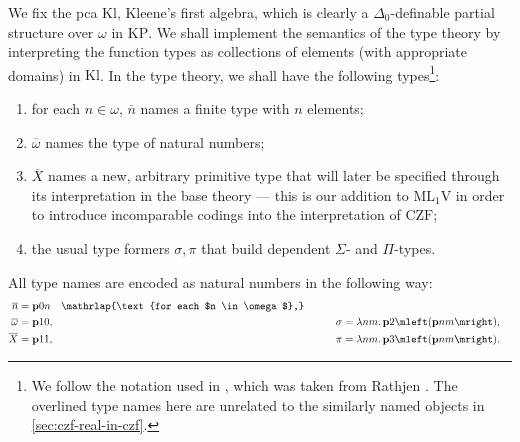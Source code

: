 \documentclass[12pt,openany]{book}
\theoremstyle{plain}
\theoremstyle{definition}
\newcommand\uplabel[1]{\textup{(#1)}}
\newcommand\oplam[1]{\mathop{\lambda #1.}}
\newcommand\KP{\mathrm{KP}}
\newcommand\CZF{\mathrm{CZF}}
\newcommand\MLV{\mathrm{ML}_1\mathrm{V}}
\newcommand\Kl{\mathrm{Kl}}
\newcommand\bp{\mathbf{p}}
\begin{document}
We fix the pca $\Kl$, Kleene's first algebra, which is clearly a $\Delta_0$-definable partial structure over $\omega$ in $\KP$. We shall implement the semantics of the type theory by interpreting the function types as collections of elements (with appropriate domains) in $\Kl$. In the type theory, we shall have the following types\footnote{We follow the notation used in \cite{wang-sw26-czf-v-l-pre}, which was taken from Rathjen \cite{rathjen14-czf-lpo}. The overlined type names here are unrelated to the similarly named objects in \autoref{sec:czf-real-in-czf}.}:
\begin{enumerate}[label=\uplabel{\arabic*}]
  \item for each $n \in \omega$, $\overline{n}$ names a finite type with $n$ elements;
  \item $\overline{\omega}$ names the type of natural numbers;
  \item $\overline{X}$ names a new, arbitrary primitive type that will later be specified through its interpretation in the base theory --- this is our addition to $\MLV$ in order to introduce incomparable codings into the interpretation of $\CZF$;
  \item the usual type formers $\sigma, \pi$ that build dependent $\Sigma$- and $\Pi$-types.
\end{enumerate}
All type names are encoded as natural numbers in the following way:
\begin{alignat*}{2}
  \overline{n}      & = \bp 0n \quad \mathrlap{\text{for each $n \in \omega$},}                                                             \\
  \overline{\omega} & = \bp 10,                                                 & \qquad \sigma & = \oplam{nm} \bp 2 \mleft(\bp nm\mright), \\
  \overline{X}      & = \bp 11,                                                 & \pi           & = \oplam{nm} \bp 3 \mleft(\bp nm\mright).
\end{alignat*}
\end{document}
